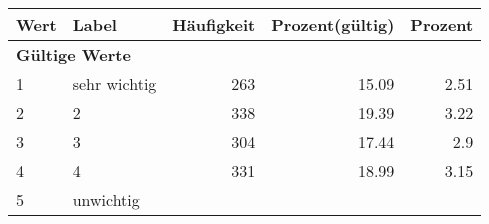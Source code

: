      \begin{longtable}{lXrrr}
     \toprule
     \textbf{Wert} & \textbf{Label} & \textbf{Häufigkeit} & \textbf{Prozent(gültig)} & \textbf{Prozent} \\
     \endhead
     \midrule
     \multicolumn{5}{l}{\textbf{Gültige Werte}}\\

     1 &
     \multicolumn{1}{X}{ sehr wichtig   } &


       \num{263} &
       \num[round-mode=places,round-precision=2]{15.09} &
         \num[round-mode=places,round-precision=2]{2.51} \\

     2 &
     \multicolumn{1}{X}{ 2   } &


       \num{338} &
       \num[round-mode=places,round-precision=2]{19.39} &
         \num[round-mode=places,round-precision=2]{3.22} \\

     3 &
     \multicolumn{1}{X}{ 3   } &


       \num{304} &
       \num[round-mode=places,round-precision=2]{17.44} &
         \num[round-mode=places,round-precision=2]{2.9} \\

     4 &
     \multicolumn{1}{X}{ 4   } &


       \num{331} &
       \num[round-mode=places,round-precision=2]{18.99} &
         \num[round-mode=places,round-precision=2]{3.15} \\

     5 &
     \multicolumn{1}{X}{ unwichtig   } &



\end{longtable}
